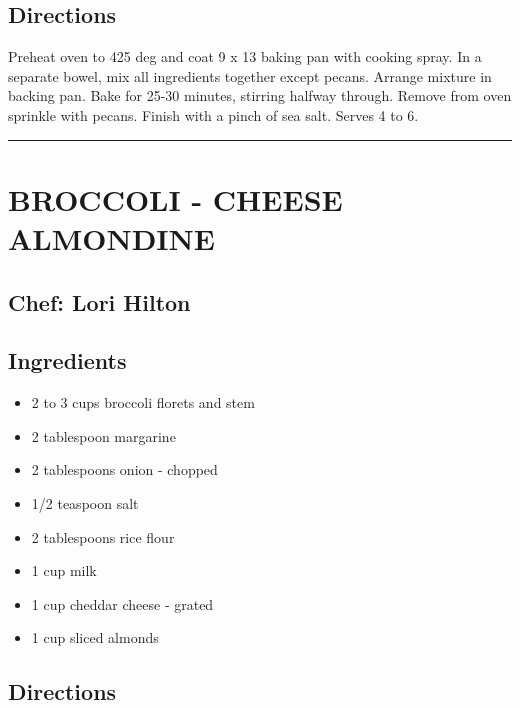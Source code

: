 \documentclass[
]{book}
\providecommand{\tightlist}{%
  \setlength{\itemsep}{0pt}\setlength{\parskip}{0pt}}
\begin{document}
\hypertarget{directions-26}{%
\subsection*{Directions}\label{directions-26}}


Preheat oven to 425 deg and coat 9 x 13 baking pan with cooking spray.
In a separate bowel, mix all ingredients together except pecans.
Arrange mixture in backing pan. Bake for 25-30 minutes, stirring halfway through.
Remove from oven sprinkle with pecans. Finish with a pinch of sea salt. Serves 4 to 6.

\begin{center}\rule{0.5\linewidth}{0.5pt}\end{center}

\hypertarget{broccoli---cheese-almondine}{%
\section*{BROCCOLI - CHEESE ALMONDINE}\label{broccoli---cheese-almondine}}


\hypertarget{chef-lori-hilton-1}{%
\subsection*{Chef: Lori Hilton}\label{chef-lori-hilton-1}}


\hypertarget{ingredients-27}{%
\subsection*{Ingredients}\label{ingredients-27}}


\begin{itemize}
\tightlist
\item
  2 to 3 cups broccoli florets and stem
\item
  2 tablespoon margarine
\item
  2 tablespoons onion - chopped
\item
  1/2 teaspoon salt
\item
  2 tablespoons rice flour
\item
  1 cup milk
\item
  1 cup cheddar cheese - grated
\item
  1 cup sliced almonds
\end{itemize}

\hypertarget{directions-27}{%
\subsection*{Directions}\label{directions-27}}
\end{document}
